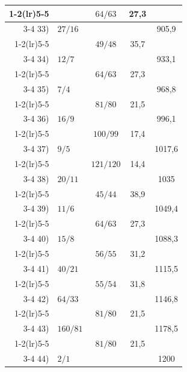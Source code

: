 {\begin{longtable}{r @{\;} l c c c}
  \cmidrule(lr){1-2}\cmidrule(lr){5-5}
     &           & $64/63$ & 27,3 &       \\
  \cmidrule(lr){3-4}
  33) & $27/16$ &           &      & 905,9 \\
  \cmidrule(lr){1-2}\cmidrule(lr){5-5}
     &           & $49/48$ & 35,7 &       \\
  \cmidrule(lr){3-4}
  34) & $12/7$ &           &      & 933,1 \\
  \cmidrule(lr){1-2}\cmidrule(lr){5-5}
     &           & $64/63$ & 27,3 &       \\
  \cmidrule(lr){3-4}
  35) & $7/4$ &           &      & 968,8 \\
  \cmidrule(lr){1-2}\cmidrule(lr){5-5}
     &           & $81/80$ & 21,5 &       \\
  \cmidrule(lr){3-4}
  36) & $16/9$ &           &      & 996,1 \\
  \cmidrule(lr){1-2}\cmidrule(lr){5-5}
     &           & $100/99$ & 17,4 &       \\
  \cmidrule(lr){3-4}
  37) & $9/5$ &           &      & 1017,6 \\
  \cmidrule(lr){1-2}\cmidrule(lr){5-5}
     &           & $121/120$ & 14,4 &       \\
  \cmidrule(lr){3-4}
  38) & $20/11$ &           &      & 1035 \\
  \cmidrule(lr){1-2}\cmidrule(lr){5-5}
     &           & $45/44$ & 38,9 &       \\
  \cmidrule(lr){3-4}
  39) & $11/6$ &           &      & 1049,4 \\
  \cmidrule(lr){1-2}\cmidrule(lr){5-5}
     &           & $64/63$ & 27,3 &       \\
  \cmidrule(lr){3-4}
  40) & $15/8$ &           &      & 1088,3 \\
  \cmidrule(lr){1-2}\cmidrule(lr){5-5}
     &           & $56/55$ & 31,2 &       \\
  \cmidrule(lr){3-4}
  41) & $40/21$ &           &      & 1115,5 \\
  \cmidrule(lr){1-2}\cmidrule(lr){5-5}
     &           & $55/54$ & 31,8 &       \\
  \cmidrule(lr){3-4}
  42) & $64/33$ &           &      & 1146,8 \\
  \cmidrule(lr){1-2}\cmidrule(lr){5-5}
     &           & $81/80$ & 21,5 &       \\
  \cmidrule(lr){3-4}
  43) & $160/81$ &           &      & 1178,5 \\
  \cmidrule(lr){1-2}\cmidrule(lr){5-5}
     &           & $81/80$ & 21,5 &       \\
  \cmidrule(lr){3-4}
  44) & $2/1$ &           &      & 1200 \\
\end{longtable}
}

